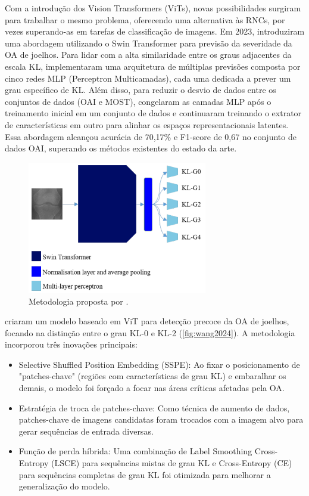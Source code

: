 Com a introdução dos Vision Transformers (ViTs), novas possibilidades surgiram para trabalhar o mesmo problema, oferecendo uma alternativa às RNCs, por vezes superando-as em tarefas de classificação de imagens. Em 2023, \cite{sekhri2023} introduziram uma abordagem utilizando o Swin Transformer para previsão da severidade da OA de joelhos. Para lidar com a alta similaridade entre os graus adjacentes da escala KL, implementaram uma arquitetura de múltiplas previsões composta por cinco redes MLP (Perceptron Multicamadas), cada uma dedicada a prever um grau específico de KL. Além disso, para reduzir o desvio de dados entre os conjuntos de dados (OAI e MOST), congelaram as camadas MLP após o treinamento inicial em um conjunto de dados e continuaram treinando o extrator de características em outro para alinhar os espaços representacionais latentes. Essa abordagem alcançou acurácia de 70,17\% e F1-score de 0,67 no conjunto de dados OAI, superando os métodos existentes do estado da arte.

\begin{figure}[ht]
    \centering
    \includegraphics[width=0.7\textwidth]{figs/sekhri2023.png}
    \caption{Metodologia proposta por \cite{sekhri2023}.}
    \label{fig:sekhri2023}
\end{figure}

\cite{Wang_2024} criaram um modelo baseado em ViT para detecção precoce da OA de joelhos, focando na distinção entre o grau KL-0 e KL-2 (\autoref{fig:wang2024}). A metodologia incorporou três inovações principais:

\begin{itemize}
    \item Selective Shuffled Position Embedding (SSPE): Ao fixar o posicionamento de "patches-chave" (regiões com características de grau KL) e embaralhar os demais, o modelo foi forçado a focar nas áreas críticas afetadas pela OA.
    \item Estratégia de troca de patches-chave: Como técnica de aumento de dados, patches-chave de imagens candidatas foram trocados com a imagem alvo para gerar sequências de entrada diversas.
    \item Função de perda híbrida: Uma combinação de Label Smoothing Cross-Entropy (LSCE) para sequências mistas de grau KL e Cross-Entropy (CE) para sequências completas de grau KL foi otimizada para melhorar a generalização do modelo.
\end{itemize}

